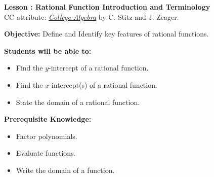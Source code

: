 \documentclass[12pt]{article}
\theoremstyle{definition}
\begin{document}
{\bf \large Lesson : Rational Function Introduction and Terminology}\label{les:rationals_introduction_and_terminology}
\\ CC attribute: \href{http://www.stitz-zeager.com}{\it{College Algebra}} by C. Stitz and J. Zeager. 
\hfill \doclicenseImage[imagewidth=5em]\\
\par
{\bf Objective:} Define and Identify key features of rational functions.\\
\par
{\bf Students will be able to:}
\begin{itemize}
	\item Find the $y$-intercept of a rational function.
	\item Find the $x$-intercept(s) of a rational function.
	\item State the domain of a rational function.
\end{itemize}
{\bf Prerequisite Knowledge:}
\begin{itemize}
	\item Factor polynomials.
	\item Evaluate functions.
	\item Write the domain of a function.
\end{itemize}
\hrulefill
\end{document}
